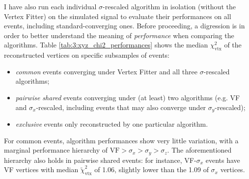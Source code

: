 I have also run each individual $\sigma$-rescaled algorithm in isolation (without the Vertex Fitter) on the simulated signal to evaluate their performances on all events, including standard-converging ones.
Before proceeding, a digression is in order to better understand the meaning of \textit{performance} when comparing the algorithms.
Table \ref{tab:3:xyz_chi2_performances} shows the median $\chi^2_\text{vtx}$ of the reconstructed vertices on specific subsamples of events:
\begin{itemize}
	\item \textit{common} events converging under Vertex Fitter and all three $\sigma$-rescaled algorithms;
	\item \textit{pairwise shared} events converging under (at least) two algorithms (e.g. VF and $\sigma_x$-rescaled, including events that may also converge under $\sigma_y$-rescaled);
	 \item \textit{exclusive} events only reconstructed by one particular algorithm.
\end{itemize}
For common events, algorithm performances show very little variation, with a marginal performance hierarchy of $\text{VF} > \sigma_x > \sigma_y > \sigma_z$.
The aforementioned hierarchy also holds in pairwise shared events:
for instance, VF-$\sigma_x$ events have VF vertices with median $\tilde{\chi}^2_\text{vtx}$ of 1.06, slightly lower than the 1.09 of $\sigma_x$ vertices.

